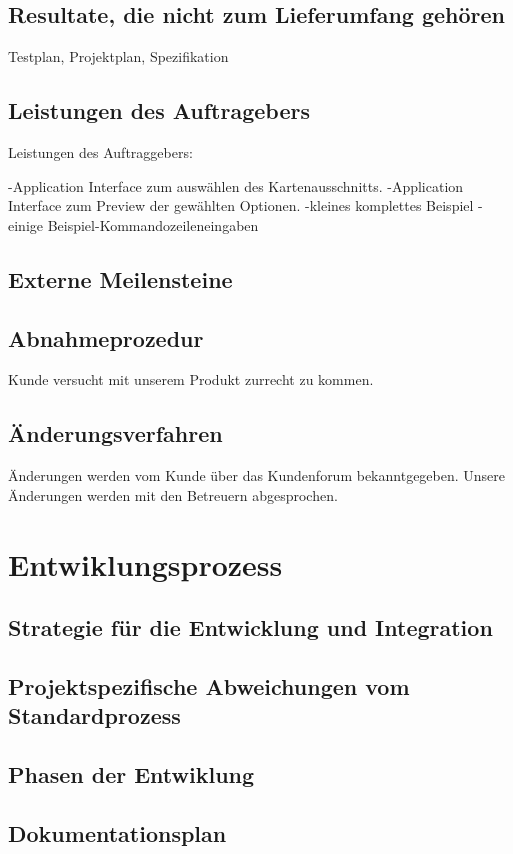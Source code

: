 \documentclass[a4paper,10pt]{scrartcl}
\begin{document}
\subsection{Resultate, die nicht zum Lieferumfang gehören}
Testplan, Projektplan, Spezifikation
\subsection{Leistungen des Auftragebers}
Leistungen des Auftraggebers:

-Application Interface zum auswählen des Kartenausschnitts.
-Application Interface zum Preview der gewählten Optionen.
-kleines komplettes Beispiel
-einige Beispiel-Kommandozeileneingaben
\subsection{Externe Meilensteine}

\subsection{Abnahmeprozedur}
Kunde versucht mit unserem Produkt zurrecht zu kommen.
\subsection{Änderungsverfahren}
Änderungen werden vom Kunde über das Kundenforum bekanntgegeben. Unsere Änderungen werden mit den Betreuern abgesprochen.


\section{Entwiklungsprozess}
\subsection{Strategie für die Entwicklung und Integration}
\subsection{Projektspezifische Abweichungen vom Standardprozess}
\subsection{Phasen der Entwiklung}
\subsection{Dokumentationsplan}
\end{document}
